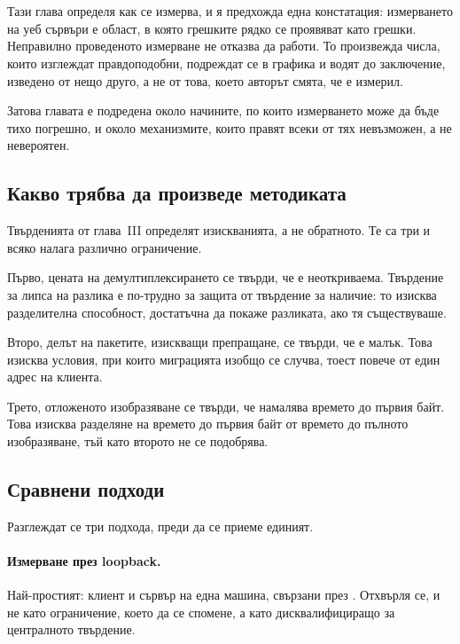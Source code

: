 \section{}

Тази глава определя как се измерва, и я предхожда една констатация: измерването на
уеб сървъри е област, в която грешките рядко се проявяват като грешки. Неправилно
проведеното измерване не отказва да работи. То произвежда числа, които изглеждат
правдоподобни, подреждат се в графика и водят до заключение, изведено от нещо друго, а не
от това, което авторът смята, че е измерил.

Затова главата е подредена около начините, по които измерването може да бъде тихо
погрешно, и около механизмите, които правят всеки от тях невъзможен, а не невероятен.

\subsection{Какво трябва да произведе методиката}

Твърденията от глава~III определят изискванията, а не обратното. Те са три и всяко налага
различно ограничение.

Първо, цената на демултиплексирането се твърди, че е неоткриваема. Твърдение за липса на
разлика е по-трудно за защита от твърдение за наличие: то изисква разделителна способност,
достатъчна да покаже разликата, ако тя съществуваше.

Второ, делът на пакетите, изискващи препращане, се твърди, че е малък. Това изисква
условия, при които миграцията изобщо се случва, тоест повече от един адрес на клиента.

Трето, отложеното изобразяване се твърди, че намалява времето до първия байт. Това изисква
разделяне на времето до първия байт от времето до пълното изобразяване, тъй като второто
не се подобрява.

\subsection{Сравнени подходи}

Разглеждат се три подхода, преди да се приеме единият.

\paragraph{Измерване през loopback.} Най-простият: клиент и сървър на една машина, свързани
през . Отхвърля се, и не като ограничение, което да се спомене, а като
дисквалифициращо за централното твърдение.

